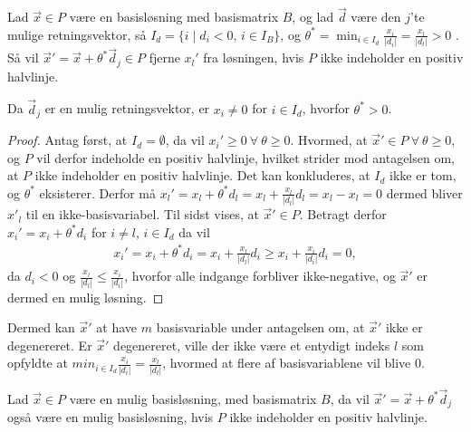 \begin{lma}
Lad $\vec{x} \in P$ være en basisløsning med basismatrix $B$, og lad $\vec{d}$ være den $j$'te mulige retningsvektor, så $I_d = \{i \mid d_i < 0, \, i  \in I_B\}$, og $\theta^* = \min_{i \in I_d} \frac{x_i}{|d_i|} =\frac{x_l}{|d_l|} > 0$ . 
Så vil $\vec{x}' = \vec{x}+ \theta^* \vec{d}_j \in P$ fjerne $x_l'$ fra løsningen, hvis $P$ ikke indeholder en positiv halvlinje.
\label{lma:skalar}
\end{lma}

\begin{bem}
Da $\vec{d}_j$ er en mulig retningsvektor, er $x_i\neq 0$ for $i \in I_d$, hvorfor $\theta^* > 0$.
\end{bem}

\begin{proof}
Antag først, at $I_d = \emptyset$, da vil $x_i' \geq 0 \ \forall \ \theta \geq 0$. 
Hvormed, at $\vec{x}' \in P \ \forall \ \theta \geq 0$, og $P$ vil derfor indeholde en positiv halvlinje, hvilket strider mod antagelsen om, at $P$ ikke indeholder en positiv halvlinje. Det kan konkluderes, at $I_d$ ikke er tom, og $\theta^*$ eksisterer.
Derfor må $x_l' = x_l + \theta^* d_l = x_l + \frac{x_l}{|d_l|}d_l = x_l - x_l = 0$ dermed bliver $x'_l$ til en ikke-basisvariabel.
Til sidst vises, at $\vec{x}' \in P$. Betragt derfor $x_i' = x_i + \theta^* d_i$ for $i \neq l$, $i \in I_d$ da vil
\begin{align*}
x_i' = x_i + \theta^* d_i = x_i + \frac{x_l}{|d_l|}d_i \geq x_i + \frac{x_i}{|d_i|}d_i = 0,
\end{align*}
da $d_i < 0$ og $\frac{x_l}{|d_l|} \leq \frac{x_i}{|d_i|}$, hvorfor alle indgange forbliver ikke-negative, og $\vec{x}'$ er dermed en mulig løsning.
\end{proof}


Dermed kan $\vec{x}'$ at have $m$ basisvariable under antagelsen om, at $\vec{x}'$ ikke er degenereret. Er $\vec{x}'$ degenereret, ville der ikke være et entydigt indeks $l$ som opfyldte at $min_{i \in I_d}\frac{x_i}{|d_i|}=\frac{x_l}{|d_l|}$, hvormed at flere af basisvariablene vil blive $0$. 

\begin{stn}
Lad $\vec{x}\in P$ være en mulig basisløsning, med basismatrix $B$, da vil $\vec{x}' = \vec{x}+ \theta^*\vec{d}_j$ også være en mulig basisløsning, hvis $P$ ikke indeholder en positiv halvlinje.
\end{stn}

